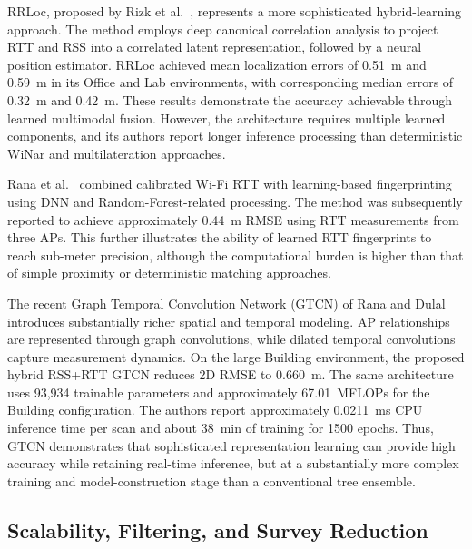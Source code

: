 RRLoc, proposed by Rizk et al.~\cite{rizk2022rrloc}, represents a more sophisticated hybrid-learning approach. The method employs deep canonical correlation analysis to project RTT and RSS into a correlated latent representation, followed by a neural position estimator. RRLoc achieved mean localization errors of 0.51~m and 0.59~m in its Office and Lab environments, with corresponding median errors of 0.32~m and 0.42~m. These results demonstrate the accuracy achievable through learned multimodal fusion. However, the architecture requires multiple learned components, and its authors report longer inference processing than deterministic WiNar and multilateration approaches.

Rana et al.~\cite{rana2023calibrated} combined calibrated Wi-Fi RTT with learning-based fingerprinting using DNN and Random-Forest-related processing. The method was subsequently reported to achieve approximately 0.44~m RMSE using RTT measurements from three APs. This further illustrates the ability of learned RTT fingerprints to reach sub-meter precision, although the computational burden is higher than that of simple proximity or deterministic matching approaches.

The recent Graph Temporal Convolution Network (GTCN) of Rana and Dulal~\cite{rana2025gtcn} introduces substantially richer spatial and temporal modeling. AP relationships are represented through graph convolutions, while dilated temporal convolutions capture measurement dynamics. On the large Building environment, the proposed hybrid RSS+RTT GTCN reduces 2D RMSE to 0.660~m. The same architecture uses 93,934 trainable parameters and approximately 67.01~MFLOPs for the Building configuration. The authors report approximately 0.0211~ms CPU inference time per scan and about 38~min of training for 1500 epochs. Thus, GTCN demonstrates that sophisticated representation learning can provide high accuracy while retaining real-time inference, but at a substantially more complex training and model-construction stage than a conventional tree ensemble.

\subsection{Scalability, Filtering, and Survey Reduction}
\label{subsec:rw_scalable}


